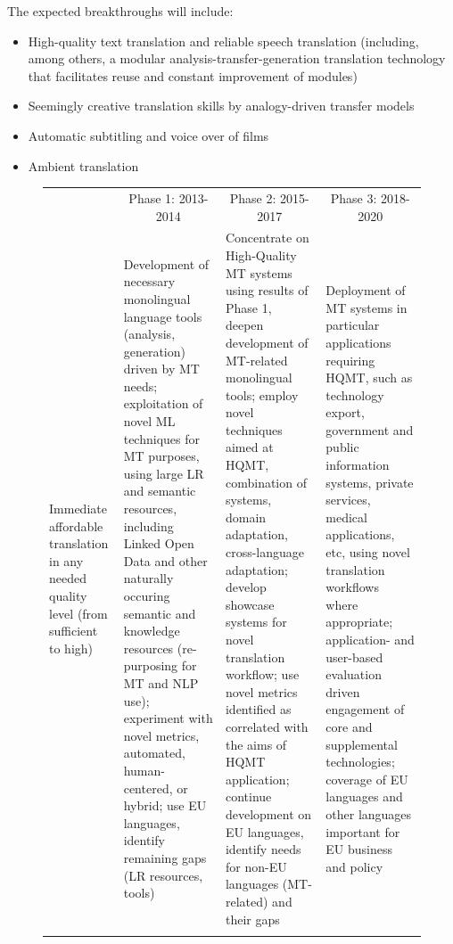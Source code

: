 \documentclass[10pt, plain]{../../metanetpaper}
\begin{document}
\begin{multicols}{2}
The expected breakthroughs will include:

\begin{itemize}
\item High-quality text translation and reliable speech translation (including, among others, a modular analysis-transfer-generation translation technology that facilitates reuse and constant improvement of modules)
\item Seemingly creative translation skills by analogy-driven transfer models
\item Automatic subtitling and voice over of films
\item Ambient translation
\end{itemize}

\begin{figure}[htbp]
  \centering
  \small
  \begin{tabular}{@{}p{2.5cm}p{4cm}p{4cm}p{4cm}@{}} \toprule\addlinespace
    \multicolumn{1}{c}{Research Priority} & \multicolumn{1}{c}{Phase 1: 2013-2014} & \multicolumn{1}{c}{Phase 2: 2015-2017} & \multicolumn{1}{c}{Phase 3: 2018-2020} \\ \addlinespace\midrule\addlinespace
    Immediate affordable translation in any needed quality level (from sufficient to high) & Development of necessary monolingual language tools (analysis, generation) driven by MT needs; exploitation of novel ML techniques for MT purposes, using large LR and semantic resources, including Linked Open Data and other naturally occuring semantic and knowledge  resources (re-purposing for MT and NLP use); experiment with novel metrics, automated, human-centered, or hybrid; use EU languages, identify remaining gaps (LR resources, tools) & Concentrate on High-Quality MT systems using results of Phase 1, deepen development of MT-related monolingual tools; employ novel techniques aimed at HQMT, combination of systems, domain adaptation, cross-language adaptation; develop showcase systems for novel translation workflow; use novel metrics identified as correlated with the aims of HQMT application; continue development on EU languages, identify needs for non-EU languages (MT-related) and their gaps & Deployment of MT systems in particular applications requiring HQMT, such as technology export, government and public information systems, private services, medical applications, etc, using novel translation workflows where appropriate; application- and user-based evaluation driven engagement of core and supplemental technologies; coverage of EU languages and other languages important for EU business and policy \\ \addlinespace

\end{tabular}
\end{figure}
\end{multicols}
\end{document}
